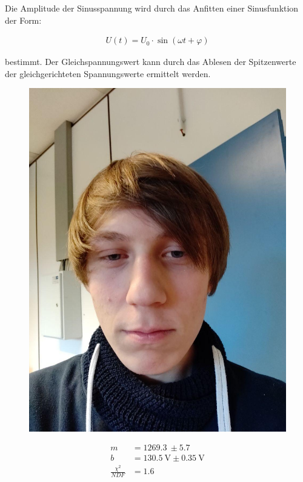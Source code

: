 \documentclass[12pt,twoside,a4paper]{scrartcl}
\begin{document}
			Die Amplitude der Sinusspannung wird durch das Anfitten einer Sinusfunktion der Form:

			\begin{align*}
				U(t) = U_0 \cdot \sin(\omega t + \varphi)
			\end{align*}

			bestimmt. Der Gleichspannungswert kann durch das Ablesen der Spitzenwerte der gleichgerichteten Spannungswerte ermittelt werden.


			\begin{figure}[H]
				\begin{minipage}{0.49 \textwidth}
					\includegraphics[width = 0.9 \textwidth]{Pictures/Platzhalter}
				\end{minipage}
				\begin{minipage}{0.49 \textwidth}
					\begin{align*}
						m &= \SI{1269.3}{} \pm \SI{5.7}{} \\
						b &= \SI{130.5}{ \volt } \pm \SI{0.35}{\volt} \\
						\frac{\chi^2}{NDF} &= 1.6
					\end{align*}
				\end{minipage}
			\end{figure}
\end{document}
